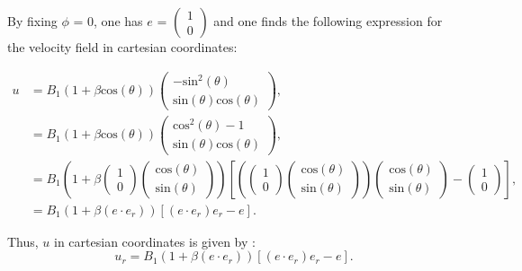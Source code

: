 \documentclass{article}
\begin{document}
   By fixing $\phi$ = 0, one has $e$ = $\begin{pmatrix}
   1 \\
   0 \end{pmatrix}$ and one finds the following expression for the velocity field 
   in cartesian coordinates: 

\begin{align*}
u &= B_1 \left(1+\beta \mathrm{cos}(\theta) \right) \begin{pmatrix}
   -\mathrm{sin}^2(\theta) \\
   \mathrm{sin}(\theta)\mathrm{cos}(\theta)
\end{pmatrix},  \\
&= B_1 \left(1+\beta \mathrm{cos}(\theta) \right) \begin{pmatrix}
   \mathrm{cos}^2(\theta)-1 \\
   \mathrm{sin}(\theta)\mathrm{cos}(\theta)
\end{pmatrix}, \\
&= B_1 \left(1+\beta \begin{pmatrix}
   1 \\
   0 \end{pmatrix}\begin{pmatrix}
   \mathrm{cos}(\theta) \\
   \mathrm{sin}(\theta)
\end{pmatrix}\right) \left[ \left( \begin{pmatrix}
   1 \\
   0 \end{pmatrix}\begin{pmatrix}
   \mathrm{cos}(\theta) \\
   \mathrm{sin}(\theta)
\end{pmatrix}\right) \begin{pmatrix}
   \mathrm{cos}(\theta) \\
   \mathrm{sin}(\theta)
\end{pmatrix} - \begin{pmatrix}
   1 \\
   0 \end{pmatrix}\right], \\
&= B_1(1+\beta (e \cdot e_r)) [(e \cdot e_r)e_r - e]. 
\end{align*}

\vspace{0.5 cm}
Thus, $u$ in cartesian coordinates is given by :
\begin{equation*}
\boxed{u_r = B_1(1+\beta (e\cdot e_r)) [(e\cdot e_r)e_r - e].}
\end{equation*}
\end{document}

